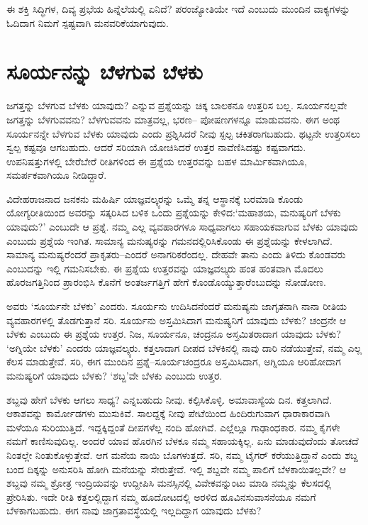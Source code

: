 ಈ ಶಕ್ತಿ ಸಿದ್ಧಿಗಳ, ದಿವ್ಯ ಪ್ರಭೆಯ ಹಿನ್ನೆಲೆಯಲ್ಲಿ ಏನಿದೆ? ಪರಂಜ್ಯೋತಿಯೇ ಇದೆ ಎಂಬುದು ಮುಂದಿನ ವಾಕ್ಯಗಳನ್ನು ಓದಿದಾಗ ನಿಮಗೆ ಸ್ಪಷ್ಟವಾಗಿ ಮನವರಿಕೆಯಾಗುವುದು.


\section*{ಸೂರ್ಯನನ್ನು ಬೆಳಗುವ ಬೆಳಕು}


ಜಗತ್ತನ್ನು ಬೆಳಗುವ ಬೆಳಕು ಯಾವುದು? ಎನ್ನುವ ಪ್ರಶ್ನೆಯನ್ನು ಚಿಕ್ಕ ಬಾಲಕನೂ ಉತ್ತರಿಸ ಬಲ್ಲ. ಸೂರ್ಯನಲ್ಲವೇ ಜಗತ್ತನ್ನು ಬೆಳಗುವವನು? ಬೆಳಗುವವನು ಮಾತ್ರವಲ್ಲ, ಭರಣ– ಪೋಷಣಗಳನ್ನೂ ಮಾಡುವವನು. ಈಗ ಅಂಥ ಸೂರ್ಯನನ್ನೇ ಬೆಳಗುವ ಬೆಳಕು ಯಾವುದು ಎಂದು ಪ್ರಶ್ನಿಸಿದರೆ ನೀವು ಸ್ಪಲ್ಪ ಚಕಿತರಾಗಬಹುದು. ಥಟ್ಟನೇ ಉತ್ತರಿಸಲು ಸ್ವಲ್ಪ ಕಷ್ಟವೂ ಆಗಬಹುದು. ಆದರೆ ಸರಿಯಾಗಿ ಯೋಚಿಸಿದರೆ ಉತ್ತರ ನಾವೆಣಿಸಿದಷ್ಟು ಕಷ್ಟವಾಗದು. ಉಪನಿಷತ್ತುಗಳಲ್ಲಿ ಬೇರೆಬೇರೆ ರೀತಿಗಳಿಂದ ಈ ಪ್ರಶ್ನೆಯ ಉತ್ತರವನ್ನು ಬಹಳ ಮಾರ್ಮಿಕವಾಗಿಯೂ, ಸಮರ್ಪಕವಾಗಿಯೂ ನೀಡಿದ್ದಾರೆ.

ವಿದೇಹರಾಜನಾದ ಜನಕನು ಮಹಿರ್ಷಿ ಯಾಜ್ಞವಲ್ಕ್ಯರನ್ನು ಒಮ್ಮೆ ತನ್ನ ಆಸ್ಥಾನಕ್ಕೆ ಬರಮಾಡಿ ಕೊಂಡು ಯೋಗ್ಯರೀತಿಯಿಂದ ಅವರನ್ನು ಸತ್ಕರಿಸಿದ ಬಳಿಕ ಒಂದು ಪ್ರಶ್ನೆಯನ್ನು ಕೇಳಿದ:\break ‘ಮಹಾಶಯ, ಮನುಷ್ಯರಿಗೆ ಬೆಳಕು ಯಾವುದು?’ ಎಂಬುದೇ ಆ ಪ್ರಶ್ನೆ. ನಮ್ಮ ಎಲ್ಲ ವ್ಯವಹಾರಗಳೂ ಸಾಧ್ಯವಾಗಲು ಸಹಾಯಕವಾಗುವ ಬೆಳಕು ಯಾವುದು ಎಂಬುದು ಪ್ರಶ್ನೆಯ ಇಂಗಿತ. ಸಾಮಾನ್ಯ ಮನುಷ್ಯರನ್ನು ಗಮನದಲ್ಲಿರಿಸಿಕೊಂಡು ಈ ಪ್ರಶ್ನೆಯನ್ನು ಕೇಳಲಾಗಿದೆ. ಸಾಮಾನ್ಯ ಮನುಷ್ಯರೆಂದರೆ ಪ್ರಾಕೃತರು–ಎಂದರೆ ಅನಾಗರಿಕರೆಂದಲ್ಲ. ದೇಹವೇ ತಾನು ಎಂದು ತಿಳಿದು ಕೊಂಡವರು ಎಂಬುದನ್ನು ಇಲ್ಲಿ ಗಮನಿಸಬೇಕು. ಈ ಪ್ರಶ್ನೆಯ ಉತ್ತರವನ್ನು ಯಾಜ್ಞವಲ್ಕ್ಯರು ಹಂತ ಹಂತವಾಗಿ ಮೊದಲು ಹೊರಜಗತ್ತಿನಿಂದ ಪ್ರಾರಂಭಿಸಿ ಕೊನೆಗೆ ಅಂತರ್ಜಗತ್ತಿಗೆ ಹೇಗೆ ಕೊಂಡೊಯ್ಯುತ್ತಾರೆಂಬುದನ್ನು ನೋಡೋಣ.

ಅವರು ‘ಸೂರ್ಯನೇ ಬೆಳಕು’ ಎಂದರು. ಸೂರ್ಯನು ಉದಿಸಿದನೆಂದರೆ ಮನುಷ್ಯನು ಜಾಗೃತನಾಗಿ ನಾನಾ ರೀತಿಯ ವ್ಯವಹಾರಗಳಲ್ಲಿ ತೊಡಗುತ್ತಾನೆ ಸರಿ. ಸೂರ್ಯನು ಅಸ್ತಮಿಸಿದಾಗ ಮನುಷ್ಯನಿಗೆ ಯಾವುದು ಬೆಳಕು? ಚಂದ್ರನೇ ಆ ಬೆಳಕು ಎಂಬುದು ಈ ಪ್ರಶ್ನೆಯ ಉತ್ತರ. ನಿಜ, ಸೂರ್ಯನೂ, ಚಂದ್ರನೂ ಅಸ್ತಮಿತರಾದಾಗ ಯಾವುದು ಬೆಳಕು? ‘ಅಗ್ನಿಯೇ ಬೆಳಕು’ ಎಂದರು ಯಾಜ್ಞವಲ್ಕ್ಯರು. ಕತ್ತಲಾದಾಗ ದೀಪದ ಬೆಳಕಿನಲ್ಲಿ ನಾವು ದಾರಿ ನಡೆಯುತ್ತೇವೆ, ನಮ್ಮ ಎಲ್ಲ ಕೆಲಸ ಮಾಡುತ್ತೇವೆ. ಸರಿ, ಈಗ ಮುಂದಿನ ಪ್ರಶ್ನೆ–ಸೂರ್ಯಚಂದ್ರರೂ ಅಸ್ತಮಿಸಿದಾಗ, ಅಗ್ನಿಯೂ ಆರಿಹೋದಾಗ ಮನುಷ್ಯರಿಗೆ ಯಾವುದು ಬೆಳಕು? ‘ಶಬ್ದ’ವೇ ಬೆಳಕು ಎಂಬುದು ಉತ್ತರ.

ಶಬ್ದವು ಹೇಗೆ ಬೆಳಕು ಆಗಲು ಸಾಧ್ಯ? ಎನ್ನಬಹುದು ನೀವು. ಕಲ್ಪಿಸಿಕೊಳ್ಳಿ. ಅಮಾವಾಸ್ಯೆಯ ದಿನ. ಕತ್ತಲಾಗಿದೆ. ಆಕಾಶವನ್ನು ಕಾರ್ಮೋಡಗಳು ಮುಸುಕಿವೆ. ಸಾಲದ್ದಕ್ಕೆ ನೀವು ಪೇಟೆಯಿಂದ ಹಿಂದಿರುಗುವಾಗ ಧಾರಾಕಾರವಾಗಿ ಮಳೆಯೂ ಸುರಿಯುತ್ತಿದೆ. ಇದ್ದಕ್ಕಿದ್ದಂತೆ ದೀಪಗಳೆಲ್ಲ ನಂದಿ ಹೋಗಿವೆ. ಎಲ್ಲೆಲ್ಲೂ ಗಾಢಾಂಧಕಾರ. ನಮ್ಮ ಕೈಗಳೇ ನಮಗೆ ಕಾಣಿಸುವುದಿಲ್ಲ. ಅಂದರೆ ಯಾವ ಹೊರಗಿನ ಬೆಳಕೂ ನಮ್ಮ ಸಹಾಯಕ್ಕಿಲ್ಲ. ಏನು ಮಾಡುವುದೆಂದು ತೋಚದೆ ನಿಂತಲ್ಲೇ ನಿಂತುಕೊಳ್ಳುತ್ತೇವೆ. ಆಗ ಮನೆಯ ನಾಯಿ ಬೊಗಳುತ್ತದೆ. ಸರಿ, ನಮ್ಮ ಟೈಗರ್ ಕರೆಯುತ್ತಿದ್ದಾನೆ ಎಂದು ಶಬ್ದ ಬಂದ ದಿಕ್ಕನ್ನು ಅನುಸರಿಸಿ ಹೋಗಿ ಮನೆಯನ್ನು ಸೇರುತ್ತೇವೆ. ಇಲ್ಲಿ ಶಬ್ದವೇ ನಮ್ಮ ಪಾಲಿಗೆ ಬೆಳಕಾಯಿತಲ್ಲವೇ? ಆ ಶಬ್ದವು ನಮ್ಮ ಶ್ರೋತ್ರ ಇಂದ್ರಿಯವನ್ನು ಉದ್ದೀಪಿಸಿ ಮನಸ್ಸಿನಲ್ಲಿ ವಿವೇಕವನ್ನುಂಟು ಮಾಡಿ ನಮ್ಮನ್ನು ಕೆಲಸದಲ್ಲಿ ಪ್ರೇರಿಸಿತು. ಇದೇ ರೀತಿ ಕತ್ತಲಲ್ಲಿದ್ದಾಗ ನಮ್ಮ ಹೂದೋಟದಲ್ಲಿ ಅರಳಿದ ಹೂವಿನಸುವಾಸನೆಯೂ ನಮಗೆ ಬೆಳಕಾಗಬಹುದು. ಈಗ ನಾವು ಜಾಗ್ರತಾವಸ್ಥೆಯಲ್ಲಿ ಇಲ್ಲದಿದ್ದಾಗ ಯಾವುದು ಬೆಳಕು?

